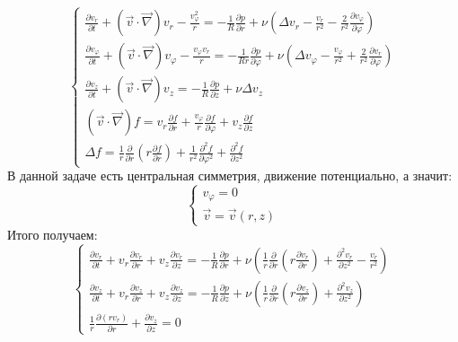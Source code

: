 \begin{equation}
    \begin{cases}
        \frac{\partial{v_r}}{\partial t} + \left(\vec{v}\cdot\vec{\nabla}\right)v_r - \frac{v_\varphi^2}{r} = -\frac{1}{R} \frac{\partial p}{\partial r} + \nu \left( \Delta v_r - \frac{v_r}{r^2} - \frac{2}{r^2} \frac{\partial v_\varphi}{\partial \varphi} \right) \\
        \frac{\partial{v_\varphi}}{\partial t} + \left(\vec{v}\cdot\vec{\nabla}\right)v_\varphi - \frac{v_\varphi v_r}{r} = -\frac{1}{Rr} \frac{\partial p}{\partial \varphi} + \nu \left( \Delta v_\varphi - \frac{v_\varphi}{r^2} + \frac{2}{r^2} \frac{\partial v_r}{\partial \varphi} \right) \\
        \frac{\partial{v_z}}{\partial t} + \left(\vec{v}\cdot\vec{\nabla}\right)v_z = -\frac{1}{R} \frac{\partial p}{\partial z} + \nu\Delta v_z \\
        \left( \vec{v} \cdot\vec{\nabla} \right)f = v_r\frac{\partial f}{\partial r} + \frac{v_\varphi}{r}\frac{\partial f}{\partial \varphi} + v_z \frac{\partial f}{\partial z} \\
        \Delta f = \frac{1}{r}\frac{\partial}{\partial r}\left( r\frac{\partial f}{\partial r} \right) + \frac{1}{r^2}\frac{\partial^2 f}{\partial \varphi^2} + \frac{\partial^2 f}{\partial z^2}
    \end{cases}
\end{equation}
В данной задаче есть центральная симметрия, движение потенциально, а значит:
\begin{equation}
    \begin{cases}
        v_\varphi = 0 \\
        \vec{v} = \vec{v}\left( r, z \right)
    \end{cases}
\end{equation}
Итого получаем:
\begin{equation}
    \begin{cases}
        \frac{\partial{v_r}}{\partial t} + v_r \frac{\partial v_r}{\partial r} + v_z \frac{\partial v_r}{\partial z} = -\frac{1}{R} \frac{\partial p}{\partial r} + \nu \left( \frac{1}{r}\frac{\partial}{\partial r}\left( r\frac{\partial v_r}{\partial r} \right) + \frac{\partial^2 v_r}{\partial z^2} - \frac{v_r}{r^2} \right) \\
        \frac{\partial{v_z}}{\partial t} + v_r \frac{\partial v_z}{\partial r} + v_z \frac{\partial v_z}{\partial z} = -\frac{1}{R} \frac{\partial p}{\partial z} + \nu\left( \frac{1}{r}\frac{\partial}{\partial r}\left( r\frac{\partial v_z}{\partial r} \right) + \frac{\partial^2 v_z}{\partial z^2} \right) \\
        \frac{1}{r}\frac{\partial \left( r v_r \right)}{\partial r} + \frac{\partial v_z}{\partial z} = 0
    \end{cases}
\end{equation}
